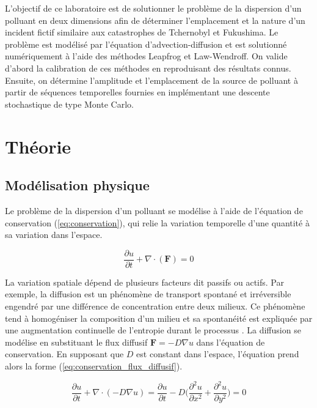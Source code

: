 \documentclass{article}
\begin{document}
L'objectif de ce laboratoire est de solutionner le problème de la dispersion d'un polluant en deux dimensions afin de déterminer l'emplacement et la nature d'un incident fictif similaire aux catastrophes de Tchernobyl et Fukushima. Le problème est modélisé par l'équation d'advection-diffusion et est solutionné numériquement à l'aide des méthodes Leapfrog et Law-Wendroff. On valide d'abord la calibration de ces méthodes en reproduisant des résultats connus. Ensuite, on détermine l'amplitude et l'emplacement de la source de polluant à partir de séquences temporelles fournies en implémentant une descente stochastique de type Monte Carlo.

\section{Théorie}
\subsection{Modélisation physique}\label{sec:model_physique}

Le problème de la dispersion d'un polluant se modélise à l'aide de l'équation de conservation (\ref{eq:conservation}), qui relie la variation temporelle d'une quantité à sa variation dans l'espace. 

\begin{equation}\label{eq:conservation}
\frac{\partial u}{\partial t} + \nabla \cdot (\textbf{F}) = 0
\end{equation}

La variation spatiale dépend de plusieurs facteurs dit passifs ou actifs. Par exemple, la diffusion est un phénomène de transport spontané et irréversible engendré par une différence de concentration entre deux milieux. Ce phénomène tend à homogéniser la composition d'un milieu et sa spontanéité est expliquée par une augmentation continuelle de l'entropie durant le processus \cite{thermodynamics}. La diffusion se modélise en substituant le flux diffusif $ \textbf{F} = -D \nabla u$ dans l'équation de conservation. En supposant que $D$ est constant dans l'espace, l'équation prend alors la forme (\ref{eq:conservation_flux_diffusif}). 

\begin{equation}\label{eq:conservation_flux_diffusif}
\frac{\partial u}{\partial t} + \nabla \cdot (-D \nabla u) = \frac{\partial u}{\partial t} - D \Big( \frac{\partial^2 u}{\partial x^2} + \frac{\partial^2 u}{\partial y^2} \Big) = 0
\end{equation}
\end{document}
